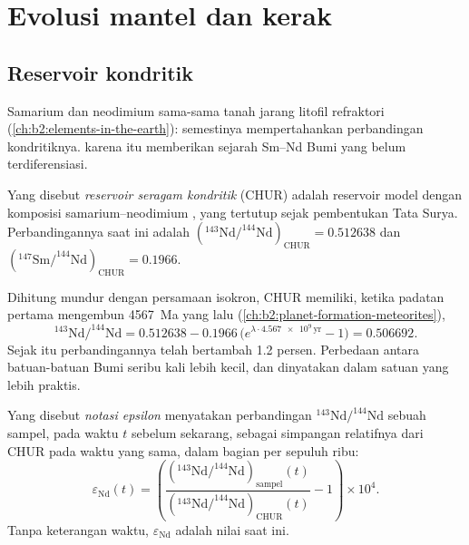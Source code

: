 \section{Evolusi mantel dan kerak}

\subsection{Reservoir kondritik}

Samarium dan neodimium sama-sama tanah jarang litofil refraktori
(\cref{ch:b2:elements-in-the-earth}):  semestinya mempertahankan
perbandingan kondritiknya.  karena itu memberikan sejarah Sm--Nd
Bumi yang belum terdiferensiasi.

\begin{definition}\label{def:b2:isotope-geochemistry:chur}
Yang disebut \emph{reservoir seragam kondritik}
(CHUR) adalah reservoir model dengan komposisi samarium--neodimium
, yang tertutup sejak pembentukan Tata Surya. Perbandingannya
saat ini adalah $(^{143}\mathrm{Nd}/^{144}\mathrm{Nd})_{\mathrm{CHUR}} = 0.512638$ dan
$(^{147}\mathrm{Sm}/^{144}\mathrm{Nd})_{\mathrm{CHUR}} = 0.1966$.
\end{definition}

Dihitung mundur dengan persamaan isokron, CHUR memiliki, ketika padatan pertama
mengembun \qty{4567}{Ma} yang lalu (\cref{ch:b2:planet-formation-meteorites}),
\[
  ^{143}\mathrm{Nd}/^{144}\mathrm{Nd} = 0.512638 - 0.1966\,\bigl(e^{\lambda\cdot
  \num{4.567e9}\,\mathrm{yr}}-1\bigr) = 0.506692 .
\] Sejak itu perbandingannya telah bertambah
1.2 persen. Perbedaan antara batuan-batuan Bumi seribu kali lebih
kecil, dan dinyatakan dalam satuan yang lebih praktis.

\begin{definition}\label{def:b2:isotope-geochemistry:epsilon}
Yang disebut \emph{notasi epsilon} menyatakan perbandingan
$^{143}\mathrm{Nd}/^{144}\mathrm{Nd}$ sebuah sampel, pada waktu $t$ sebelum
sekarang, sebagai simpangan relatifnya dari CHUR pada waktu yang sama, dalam bagian per sepuluh
ribu:
\[
  \varepsilon_{\mathrm{Nd}}(t) = \left(
  \frac{(^{143}\mathrm{Nd}/^{144}\mathrm{Nd})_{\text{sampel}}(t)}
       {(^{143}\mathrm{Nd}/^{144}\mathrm{Nd})_{\mathrm{CHUR}}(t)} - 1\right)\times 10^4 .
\]
Tanpa keterangan waktu, $\varepsilon_{\mathrm{Nd}}$ adalah nilai saat ini.
\end{definition}


